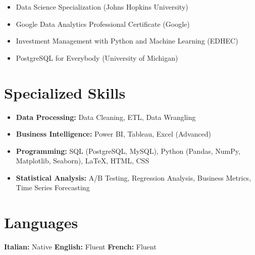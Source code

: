 \documentclass[letterpaper,10.5pt]{article}
\begin{document}
\begin{multicols}{2}
    \small
    \begin{itemize}[leftmargin=0.2in, label={-}]
        \item Data Science Specialization (Johns Hopkins University)
        \item Google Data Analytics Professional Certificate (Google)
    \end{itemize}
    \begin{itemize}[leftmargin=0.2in, label={-}]
        \item Investment Management with Python and Machine Learning (EDHEC)
        \item PostgreSQL for Everybody (University of Michigan)
    \end{itemize}
\end{multicols}

\section*{Specialized Skills}
\begin{multicols}{2}
\begin{itemize}[leftmargin=0.2in]
    \item \textbf{Data Processing:} Data Cleaning, ETL, Data Wrangling
    \item \textbf{Business Intelligence:} Power BI, Tableau, Excel (Advanced)
    \item \textbf{Programming:} SQL (PostgreSQL, MySQL), Python (Pandas, NumPy, Matplotlib, Seaborn), LaTeX, HTML, CSS
    \item \textbf{Statistical Analysis:} A/B Testing, Regression Analysis, Business Metrics, Time Series Forecasting
\end{itemize}
\end{multicols}

\section*{Languages}
\textbf{Italian:} Native \hspace{10pt} \textbf{English:} Fluent \hspace{10pt} \textbf{French:} Fluent
\end{document}
